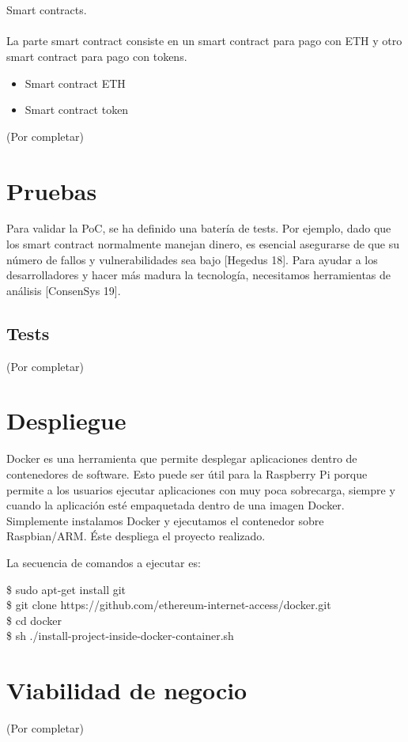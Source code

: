 \documentclass[9pt,oneside]{amsart}
\begin{document}
\begin{multicols}{2}
\\
\\
Smart contracts.
\\
\\
La parte smart contract consiste en un smart contract para pago con ETH y otro smart contract para pago con tokens.
\begin{itemize}
 \item Smart contract ETH
 \item Smart contract token
 \newline
\end{itemize}
(Por completar)
\section{Pruebas}\label{sec:proofs}
Para validar la PoC, se ha definido una batería de tests. Por ejemplo, dado que los smart contract normalmente manejan dinero, es esencial asegurarse de que su número de fallos y vulnerabilidades sea bajo [Hegedus 18]. Para ayudar a los desarrolladores y hacer más madura la tecnología, necesitamos herramientas de análisis [ConsenSys 19].
\subsection{Tests} \label{ch:tests}
(Por completar)
\section{Despliegue}\label{sec:deploy}
Docker es una herramienta que permite desplegar aplicaciones dentro de contenedores de software. Esto puede ser útil para la Raspberry Pi porque permite a los usuarios ejecutar aplicaciones con muy poca sobrecarga, siempre y cuando la aplicación esté empaquetada dentro de una imagen Docker. Simplemente instalamos Docker y ejecutamos el contenedor sobre Raspbian/ARM. Éste despliega el proyecto realizado.

La secuencia de comandos a ejecutar es:
\\
\begin{flushleft}
\$ sudo apt-get install git
\\
\$ git clone https://github.com/ethereum-internet-access/docker.git
\\
\$ cd docker
\\
\$ sh ./install-project-inside-docker-container.sh
\end{flushleft}
\section{Viabilidad de negocio}\label{sec:business}
(Por completar)

\end{multicols}
\end{document}
